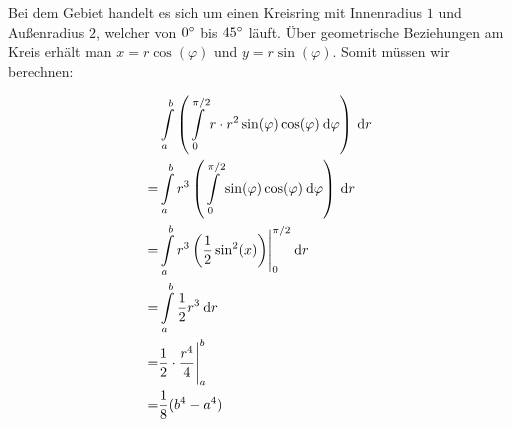 \item Bei dem Gebiet handelt es sich um einen Kreisring mit Innenradius $1$ und Außenradius $2$, welcher von $\SI{0}{\degree}$ bis $\SI{45}{\degree}$ läuft. Über geometrische Beziehungen am Kreis erhält man $x=r\cos(\varphi)$ und $y=r\sin(\varphi)$. Somit müssen wir berechnen:

\begin{alignat*}{1}
	  & \int\limits_a^b \left( \int\limits_0^{\pi/2} r \cdot r^2 \sin(\varphi)\cos(\varphi) \:\mathrm{d}{\varphi} \right) \:\mathrm{d}{r} \\
	= & \int\limits_a^b r^3 \left( \int\limits_0^{\pi/2} \sin(\varphi)\cos(\varphi) \:\mathrm{d}{\varphi} \right) \:\mathrm{d}{r} \\
	= & \int\limits_a^b r^3 \left( \frac{1}{2}\sin^2(x) \right) \Biggr|_{0}^{\pi/2} \:\mathrm{d}{r} \\
	= & \int\limits_a^b \frac{1}{2} r^3  \:\mathrm{d}{r} \\
	= & \frac{1}{2} \cdot \frac{r^4}{4}\Biggr|_a^b \\
	= & \frac{1}{8} (b^4-a^4)
\end{alignat*}
